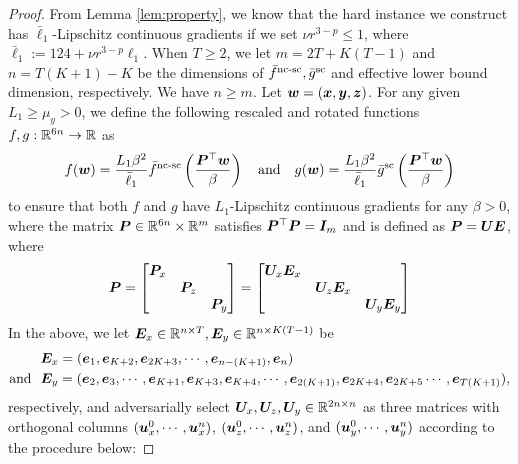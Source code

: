\begin{proof}
From Lemma \ref{lem:property}, we know that the hard instance we construct has $\bar \ell_1$-Lipschitz continuous gradients if we set $\nu r^{3-p} \le 1$, where $\bar \ell_1 :=124 + \nu r^{3-p} \ell_1$. When $T \ge 2$, we let
$m =  2T+ K(T-1)$ and $n = T(K+1)-K$ be the dimensions of $\bar f^{\text{nc-sc}}, \bar g^{\rm sc}$ and effective lower bound dimension, respectively. We have $n \ge m$. Let ${\bm{w}} = ({\bm{x}},{\bm{y}},{\bm{z}})$.
For any given $L_1 \ge \mu_y >0$, we define the following rescaled and rotated functions $f,g: {\mathbb{R}}^{6n} \rightarrow {\mathbb{R}}$ as
\begin{align} \label{eq:scaled-fg}
   f({\bm{w}}) = \frac{L_1 \beta^2}{\bar \ell_1} \bar f^{\text{nc-sc}} \left(\frac{{\bm{P}}^\top {\bm{w}}}{\beta} \right) \quad {\rm and} \quad g({\bm{w}}) = \frac{L_1 \beta^2}{\bar \ell_1} \bar g^{\rm sc} \left( \frac{{\bm{P}}^\top {\bm{w}}}{\beta} \right)
\end{align}
to ensure that both $f$ and $g$ have $L_1$-Lipschitz continuous gradients for any $\beta>0$, where the matrix ${\bm{P}} \in {\mathbb{R}}^{6 n} \times {\mathbb{R}}^{m}$ satisfies ${\bm{P}}^\top {\bm{P}} = {\bm{I}}_{m}$ and is defined as ${\bm{P}} = {\bm{U}} {\bm{E}}$, where
\begin{align} \label{eq:dfn-matrix-P}
{\bm{P}} = 
  \begin{bmatrix}
        {\bm{P}}_x & & \\
        & {\bm{P}}_z & \\
        & & {\bm{P}}_y
    \end{bmatrix}
    =
    \begin{bmatrix}
        {\bm{U}}_x {\bm{E}}_x & & \\
        & {\bm{U}}_z {\bm{E}}_x & \\
        & & {\bm{U}}_y {\bm{E}}_y
    \end{bmatrix}
\end{align}
In the above, we let ${\bm{E}}_x \in {\mathbb{R}}^{n\times T}, {\bm{E}}_y \in {\mathbb{R}}^{n \times K(T-1)}$ be
\begin{align*}
 &{\bm{E}}_x = ({\bm{e}}_1, {\bm{e}}_{K+2}, {\bm{e}}_{2K+3}, \cdots, {\bm{e}}_{n-(K+1)}, {\bm{e}}_{n}) \\
 {\rm and}~~ & {\bm{E}}_y = ({\bm{e}}_2, {\bm{e}}_3, \cdots, {\bm{e}}_{K+1}, {\bm{e}}_{K+3}, {\bm{e}}_{K+4}, \cdots, {\bm{e}}_{2(K+1)}, {\bm{e}}_{2K+4}, {\bm{e}}_{2K+5} \cdots, {\bm{e}}_{T(K+1)}),
\end{align*}
respectively, and adversarially select ${\bm{U}}_x, {\bm{U}}_z, {\bm{U}}_y \in {\mathbb{R}}^{2n\times n}$ as three matrices with orthogonal columns $({\bm{u}}_x^0,\cdots,{\bm{u}}_{x}^n)$, $({\bm{u}}_z^0,\cdots,{\bm{u}}_{z}^n)$, and $({\bm{u}}_y^0,\cdots,{\bm{u}}_{y}^n)$ according to the procedure below:

\end{proof}
